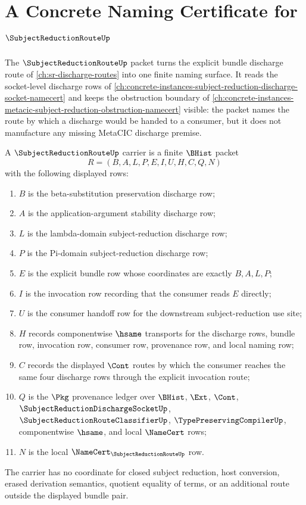 \chapter{A Concrete Naming Certificate for $\SubjectReductionRouteUp$}
\label{ch:concrete-instances-subject-reduction-route-namecert}

The $\SubjectReductionRouteUp$ packet turns the explicit bundle discharge route of \autoref{ch:sr-discharge-routes} into one finite naming surface. It reads the socket-level discharge rows of \autoref{ch:concrete-instances-subject-reduction-discharge-socket-namecert} and keeps the obstruction boundary of \autoref{ch:concrete-instances-metacic-subject-reduction-obstruction-namecert} visible: the packet names the route by which a discharge would be handed to a consumer, but it does not manufacture any missing MetaCIC discharge premise.

\begin{definition}
\label{def:subject-reduction-route-carrier}
A $\SubjectReductionRouteUp$ carrier is a finite $\BHist$ packet
$$
R=(B,A,L,P,E,I,U,H,C,Q,N)
$$
with the following displayed rows:
\begin{enumerate}
\item $B$ is the beta-substitution preservation discharge row;
\item $A$ is the application-argument stability discharge row;
\item $L$ is the lambda-domain subject-reduction discharge row;
\item $P$ is the Pi-domain subject-reduction discharge row;
\item $E$ is the explicit bundle row whose coordinates are exactly $B,A,L,P$;
\item $I$ is the invocation row recording that the consumer reads $E$ directly;
\item $U$ is the consumer handoff row for the downstream subject-reduction use site;
\item $H$ records componentwise $\hsame$ transports for the discharge rows, bundle row, invocation row, consumer row, provenance row, and local naming row;
\item $C$ records the displayed $\Cont$ routes by which the consumer reaches the same four discharge rows through the explicit invocation route;
\item $Q$ is the $\Pkg$ provenance ledger over $\BHist$, $\Ext$, $\Cont$, $\SubjectReductionDischargeSocketUp$, $\SubjectReductionRouteClassifierUp$, $\TypePreservingCompilerUp$, componentwise $\hsame$, and local $\NameCert$ rows;
\item $N$ is the local $\NameCert_{\SubjectReductionRouteUp}$ row.
\end{enumerate}
The carrier has no coordinate for closed subject reduction, host conversion, erased derivation semantics, quotient equality of terms, or an additional route outside the displayed bundle pair.
\end{definition}

